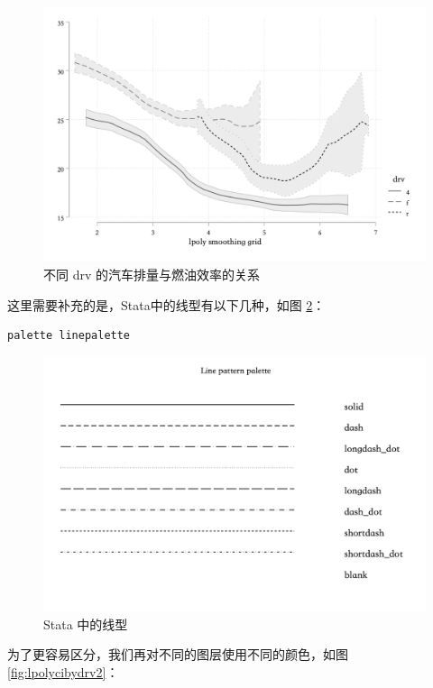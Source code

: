 \begin{figure}[htbp]
  \centering
  \includegraphics[width=\textwidth]{assets/lpolycibydrv.png}
  \caption{不同 drv 的汽车排量与燃油效率的关系}
  \label{fig:lpolycibydrv}
\end{figure}

这里需要补充的是，Stata中的线型有以下几种，如图 \ref{fig:linepalette}：

\begin{lstlisting}
palette linepalette
\end{lstlisting}

\begin{figure}[htbp]
  \centering \includegraphics[width=\textwidth]{assets/linepalette.png}
  \caption{Stata 中的线型}\label{fig:linepalette}
\end{figure}

为了更容易区分，我们再对不同的图层使用不同的颜色，如图 \ref{fig:lpolycibydrv2}：

